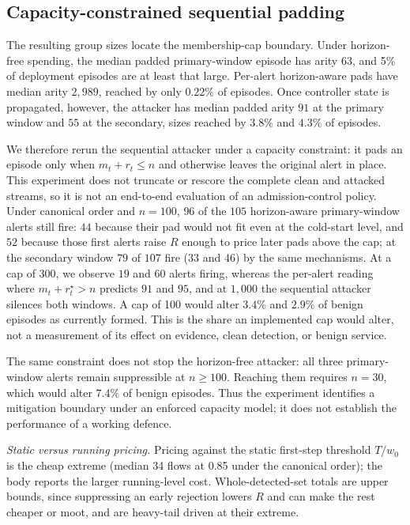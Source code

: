 \documentclass[conference]{IEEEtran}
\begin{document}
\subsection{Capacity-constrained sequential padding}\label{app:capacity}

The resulting group sizes locate the membership-cap boundary. Under horizon-free spending, the
median padded primary-window episode has arity 63, and 5\% of deployment episodes are at least that
large. Per-alert horizon-aware pads have median arity $2{,}989$, reached by only $0.22\%$ of
episodes. Once controller state is propagated, however, the attacker has median padded arity $91$ at
the primary window and $55$ at the secondary, sizes reached by $3.8\%$ and $4.3\%$ of episodes.

We therefore rerun the sequential attacker under a capacity constraint: it pads an episode only when
$m_t+r_t\le n$ and otherwise leaves the original alert in place. This experiment does not truncate or
rescore the complete clean and attacked streams, so it is not an end-to-end evaluation of an
admission-control policy. Under canonical order and $n=100$, $96$ of
the $105$ horizon-aware primary-window alerts still fire: $44$ because their pad would not fit even at
the cold-start level, and $52$ because those first alerts raise $R$ enough to price later pads above
the cap; at the secondary window $79$ of $107$ fire ($33$ and $46$) by the same mechanisms. At a cap
of 300, we observe $19$ and $60$ alerts firing, whereas the per-alert reading where
$m_t+r^{\star}_t>n$ predicts $91$ and $95$, and at $1{,}000$ the sequential attacker silences both
windows. A cap of 100 would alter
$3.4\%$ and $2.9\%$ of benign episodes as currently formed. This is the share an implemented cap
would alter, not a measurement of its effect on evidence, clean detection, or benign service.

The same constraint does not stop the horizon-free attacker: all three primary-window alerts remain
suppressible at $n\ge100$. Reaching them requires $n=30$, which would alter $7.4\%$ of benign
episodes. Thus the experiment identifies a mitigation boundary under an enforced capacity model; it
does not establish the performance of a working defence.

\emph{Static versus running pricing.} Pricing against the static first-step threshold $T/w_0$ is the
cheap extreme (median 34 flows at 0.85 under the canonical order); the body reports the larger
running-level cost. Whole-detected-set totals are upper bounds, since suppressing an early rejection
lowers $R$ and can make the rest cheaper or moot, and are heavy-tail driven at their extreme.
\end{document}
